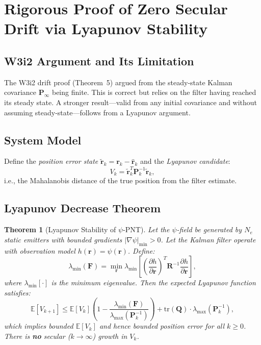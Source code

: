 \documentclass[aps,prd,twocolumn,superscriptaddress,nofootinbib]{revtex4-2}
\newtheorem{theorem}{Theorem}
\begin{document}
\section{Rigorous Proof of Zero Secular Drift via Lyapunov Stability}
\label{sec:lyapunov}

\subsection{W3i2 Argument and Its Limitation}

The W3i2 drift proof (Theorem~5) argued from the steady-state Kalman
covariance $\mathbf{P}_\infty$ being finite.  This is correct but
relies on the filter having reached its steady state.  A stronger
result---valid from any initial covariance and without assuming
steady-state---follows from a Lyapunov argument.

\subsection{System Model}

Define the \emph{position error state}
$\tilde{\mathbf{r}}_k = \mathbf{r}_k - \hat{\mathbf{r}}_k$ and the
\emph{Lyapunov candidate}:
\begin{equation}
  V_k = \tilde{\mathbf{r}}_k^T \mathbf{P}_k^{-1} \tilde{\mathbf{r}}_k,
  \label{eq:lyapunov}
\end{equation}
i.e., the Mahalanobis distance of the true position from the filter
estimate.

\subsection{Lyapunov Decrease Theorem}

\begin{theorem}[Lyapunov Stability of $\psi$-PNT]
\label{thm:lyapunov}
Let the $\psi$-field be generated by $N_e$ static emitters with bounded
gradients $|\nabla\psi|_{\min} > 0$.  Let the Kalman filter operate
with observation model $h(\mathbf{r}) = \psi(\mathbf{r})$.  Define:
\begin{equation}
  \lambda_{\min}(\mathbf{F}) = \min_\mathbf{r}
  \lambda_{\min}\!\left[\left(\frac{\partial h}{\partial\mathbf{r}}\right)^T
  \mathbf{R}^{-1}
  \frac{\partial h}{\partial\mathbf{r}}\right],
\end{equation}
where $\lambda_{\min}[\cdot]$ is the minimum eigenvalue.  Then the
expected Lyapunov function satisfies:
\begin{equation}
  \boxed{
  \mathbb{E}[V_{k+1}] \leq \mathbb{E}[V_k]\!\left(1
  - \frac{\lambda_{\min}(\mathbf{F})}
         {\lambda_{\max}(\mathbf{P}_k^{-1})}\right)
  + \mathrm{tr}(\mathbf{Q})\cdot\lambda_{\max}(\mathbf{P}_k^{-1}),
  }
  \label{eq:lyapunov-decrease}
\end{equation}
which implies bounded $\mathbb{E}[V_k]$ and hence bounded position
error for all $k \geq 0$.  There is \textbf{no} secular ($k\to\infty$)
growth in $V_k$.
\end{theorem}
\end{document}

